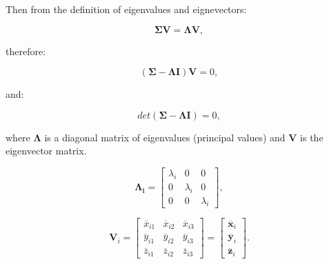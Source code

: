 \begin{itemize}
        Then from the definition of eigenvalues and eignevectors:

        \begin{equation}
            \mathbf{\Sigma}\mathbf{V} = \mathbf{\Lambda} \mathbf{V}
        ,\end{equation}

        therefore:

        \begin{equation}
            (\mathbf{\Sigma} - \mathbf{\Lambda}\mathbf{I})\mathbf{V} = 0
        ,\end{equation}

        and:

        \begin{equation}
            det(\mathbf{\Sigma} - \mathbf{\Lambda}\mathbf{I}) = 0
        ,\end{equation}

        where $\mathbf{\Lambda}$ is a diagonal matrix of eigenvalues (principal values)
        and $\mathbf{V}$ is the eigenvector matrix.

        \begin{equation}
            \mathbf{\Lambda_{i}} = \begin{bmatrix}
                \lambda_{i} & 0 & 0 \\
                0 & \lambda_{i} & 0 \\
                0 & 0 & \lambda_{i}
            \end{bmatrix}
            \label{eqn:eigenvalues}
        ,\end{equation}

        \begin{equation}
            \mathbf{V}_{i}
            = \begin{bmatrix}
                \overline{x}_{i1} & \overline{x}_{i2} & \overline{x}_{i3}\\
                \overline{y}_{i1} & \overline{y}_{i2} & \overline{y}_{i3}\\
                \overline{z}_{i1} & \overline{z}_{i2} & \overline{z}_{i3}
            \end{bmatrix}
            = \begin{bmatrix}
                \overline{\mathbf{x}}_{i}\\
                \overline{\mathbf{y}}_{i}\\
                \overline{\mathbf{z}}_{i}
            \end{bmatrix}
        .\end{equation}


\end{itemize}
